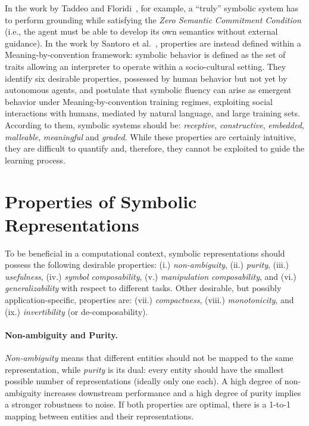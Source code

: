 In the work by Taddeo and Floridi~\cite{taddeo2005solving}, for example, a ``truly'' symbolic system has to perform grounding while satisfying the \textit{Zero Semantic Commitment Condition} (i.e., the agent must be able to develop its own semantics without external guidance). In the work by Santoro et al.~\cite{santoro2021symbolic}, properties are instead defined within a Meaning-by-convention framework: symbolic behavior is defined as the set of traits allowing an interpreter to operate within a socio-cultural setting. They identify six desirable properties, possessed by human behavior but not yet by autonomous agents, and postulate that symbolic fluency can arise as emergent behavior under Meaning-by-convention training regimes, exploiting social interactions with humans, mediated by natural language, and large training sets. According to them, symbolic systems should be: \textit{receptive}, \textit{constructive}, \textit{embedded}, \textit{malleable}, \textit{meaningful} and \textit{graded}. While these properties are certainly intuitive, they are difficult to quantify and, therefore, they cannot be exploited to guide the learning process.


\section{Properties of Symbolic Representations}
\label{nesy2023:sec:psr}

To be beneficial in a computational context, symbolic representations should possess the following desirable properties: (i.) \textit{non-ambiguity}, (ii.) \textit{purity}, (iii.) \textit{usefulness}, (iv.) \textit{symbol composability}, (v.) \textit{manipulation composability}, and (vi.) \textit{generalizability} with respect to different tasks.
Other desirable, but possibly application-specific, properties are: (vii.) \textit{compactness}, (viii.) \textit{monotonicity}, and (ix.) \textit{invertibility} (or de-composability).

\paragraph{Non-ambiguity and Purity.} \textit{Non-ambiguity} means that different entities should not be mapped to the same representation, while \textit{purity} is its dual: every entity should have the smallest possible number of representations (ideally only one each). A high degree of non-ambiguity increases downstream performance and a high degree of purity implies a stronger robustness to noise. If both properties are optimal, there is a 1-to-1 mapping between entities and their representations.

